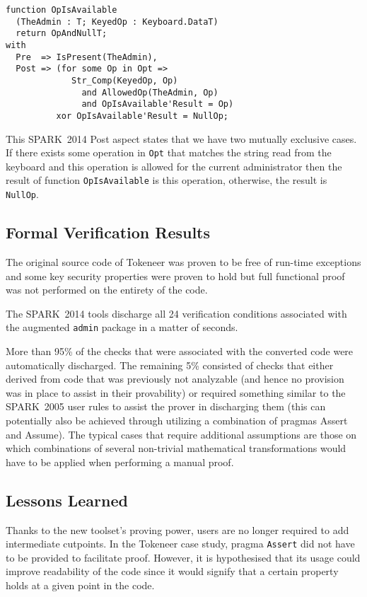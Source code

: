 \documentclass[10pt,a4paper,twocolumn]{article}
\newcommand{\oldspark}{SPARK~2005\xspace}
\newcommand{\newspark}{SPARK~2014\xspace}
\begin{document}
\begin{lstlisting}
function OpIsAvailable
  (TheAdmin : T; KeyedOp : Keyboard.DataT)
  return OpAndNullT;
with
  Pre  => IsPresent(TheAdmin),
  Post => (for some Op in Opt =>
             Str_Comp(KeyedOp, Op)
               and AllowedOp(TheAdmin, Op)
               and OpIsAvailable'Result = Op)
          xor OpIsAvailable'Result = NullOp;
\end{lstlisting}
This \newspark Post aspect states that we have two mutually exclusive
cases. If there exists some operation in \verb|Opt| that matches the
string read from the keyboard and this operation is allowed for the
current administrator then the result of function \verb|OpIsAvailable|
is this operation, otherwise, the result is \verb|NullOp|.

\subsection{Formal Verification Results}

The original source code of Tokeneer was proven to be free of run-time
exceptions and some key security properties were proven to hold but
full functional proof was not performed on the entirety of the code.

The \newspark tools discharge all 24 verification conditions
associated with the augmented \verb|admin| package in a matter of
seconds.

More than 95\% of the checks that were associated with the converted
code were automatically discharged. The remaining 5\% consisted of
checks that either derived from code that was previously not
analyzable (and hence no provision was in place to assist in their
provability) or required something similar to the \oldspark user rules
to assist the prover in discharging them (this can potentially also be
achieved through utilizing a combination of pragmas Assert and
Assume). The typical cases that require additional assumptions are
those on which combinations of several non-trivial mathematical
transformations would have to be applied when performing a manual
proof.

\subsection{Lessons Learned}

Thanks to the new toolset's proving power, users are no longer
required to add intermediate cutpoints. In the Tokeneer case study,
pragma \verb|Assert| did not have to be provided to facilitate
proof. However, it is hypothesised that its usage could improve
readability of the code since it would signify that a certain property
holds at a given point in the code.
\end{document}
